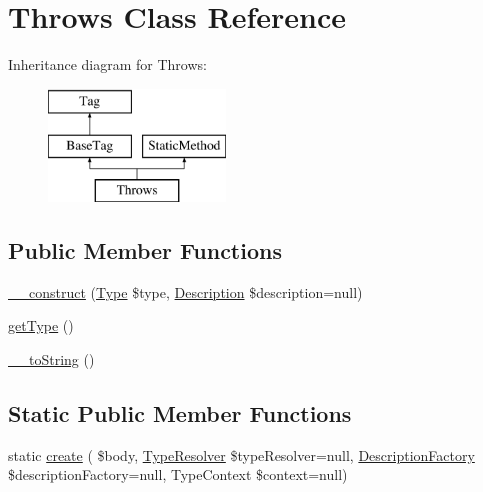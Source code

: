 \hypertarget{classphp_documentor_1_1_reflection_1_1_doc_block_1_1_tags_1_1_throws}{}\section{Throws Class Reference}
\label{classphp_documentor_1_1_reflection_1_1_doc_block_1_1_tags_1_1_throws}
Inheritance diagram for Throws\+:\begin{figure}[H]
\begin{center}
\leavevmode
\includegraphics[height=3.000000cm]{classphp_documentor_1_1_reflection_1_1_doc_block_1_1_tags_1_1_throws}
\end{center}
\end{figure}
\subsection*{Public Member Functions}
\begin{DoxyCompactItemize}
\item 
\mbox{\hyperlink{classphp_documentor_1_1_reflection_1_1_doc_block_1_1_tags_1_1_throws_a80be117d1458096d559ebfcdc0b28978}{\+\_\+\+\_\+construct}} (\mbox{\hyperlink{interfacephp_documentor_1_1_reflection_1_1_type}{Type}} \$type, \mbox{\hyperlink{classphp_documentor_1_1_reflection_1_1_doc_block_1_1_description}{Description}} \$description=null)
\item 
\mbox{\hyperlink{classphp_documentor_1_1_reflection_1_1_doc_block_1_1_tags_1_1_throws_a830b5c75df72b32396701bc563fbe3c7}{get\+Type}} ()
\item 
\mbox{\hyperlink{classphp_documentor_1_1_reflection_1_1_doc_block_1_1_tags_1_1_throws_a7516ca30af0db3cdbf9a7739b48ce91d}{\+\_\+\+\_\+to\+String}} ()
\end{DoxyCompactItemize}
\subsection*{Static Public Member Functions}
\begin{DoxyCompactItemize}
\item 
static \mbox{\hyperlink{classphp_documentor_1_1_reflection_1_1_doc_block_1_1_tags_1_1_throws_a01b1e5c3741d05766720d8cb6d900172}{create}} ( \$body, \mbox{\hyperlink{classphp_documentor_1_1_reflection_1_1_type_resolver}{Type\+Resolver}} \$type\+Resolver=null, \mbox{\hyperlink{classphp_documentor_1_1_reflection_1_1_doc_block_1_1_description_factory}{Description\+Factory}} \$description\+Factory=null, Type\+Context \$context=null)
\end{DoxyCompactItemize}
